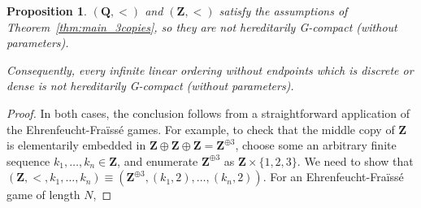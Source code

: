 \documentclass[final,a4paper,12pt]{amsart}
\newcommand{\bZ}{{\mathbf{Z}}}
\newcommand{\bQ}{{\mathbf{Q}}}
\newtheorem{prop}[thm]{Proposition}
\theoremstyle{remark}
\theoremstyle{definition}
\begin{document}
	\begin{prop}
		$(\bQ,<)$ and $(\bZ,<)$ satisfy the assumptions of Theorem~\ref{thm:main_3copies}, so they are not hereditarily G-compact (without parameters).
		
		Consequently, every infinite linear ordering without endpoints which is discrete or dense is not hereditarily G-compact (without parameters).
	\end{prop}
	\begin{proof}
		In both cases, the conclusion follows from a straightforward application of the Ehrenfeucht-Fraïssé games. For example, to check that the middle copy of $\bZ$ is elementarily embedded in $\bZ\oplus \bZ\oplus \bZ=\bZ^{\oplus 3}$, choose some an arbitrary finite sequence $k_1,\ldots, k_n\in \bZ$, and enumerate $\bZ^{\oplus 3}$ as $\bZ\times \{1,2,3\}$. We need to show that $(\bZ,<,k_1,\ldots,k_n)\equiv (\bZ^{\oplus 3},(k_1,2),\ldots,(k_n,2))$. For an Ehrenfeucht-Fraïssé game of length $N$, 
	\end{proof}
	
\end{document}

